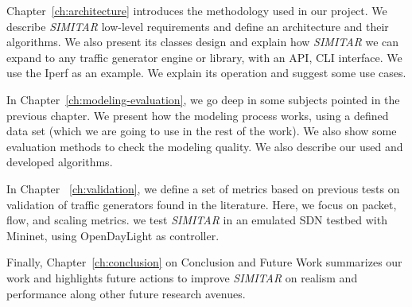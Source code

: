 Chapter~\ref{ch:architecture} introduces the methodology used in our project. We describe \textit{SIMITAR} low-level requirements and define an architecture and their algorithms.  We also present its classes design and explain how \textit{SIMITAR} we can expand to any traffic generator engine or library, with an API, CLI interface. We use the Iperf as an example. We explain its operation and suggest some use cases.

In Chapter~\ref{ch:modeling-evaluation}, we go deep in some subjects pointed in the previous chapter. We present how the modeling process works, using a defined data set (which we are going to use in the rest of the work). We also show some evaluation methods to check the modeling quality. We also describe our used and developed algorithms.

In Chapter ~\ref{ch:validation}, we define a set of metrics based on previous tests on validation of traffic generators found in the literature. Here, we focus on packet, flow, and scaling metrics. we test \textit{SIMITAR} in an emulated SDN testbed with Mininet, using OpenDayLight as controller\cite{web-opendaylight}. 


Finally, Chapter~\ref{ch:conclusion} on Conclusion and Future Work summarizes our work and highlights future actions to improve \textit{SIMITAR} on realism and performance along other future research avenues.

